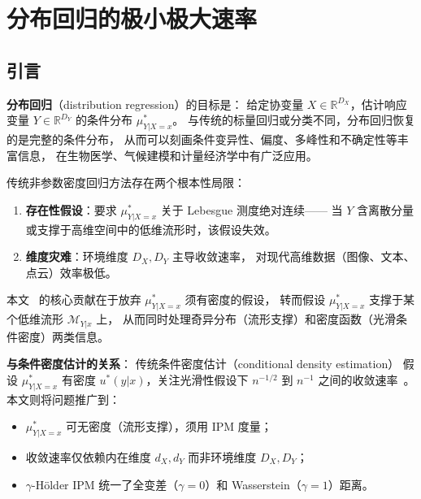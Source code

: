 \chapter{分布回归的极小极大速率}\label{ch:chapter2}

\section{引言}\label{sec:ch2-intro}

\textbf{分布回归}（distribution regression）的目标是：
给定协变量 $X \in \mathbb{R}^{D_X}$，估计响应变量 $Y \in \mathbb{R}^{D_Y}$
的条件分布 $\mu^*_{Y|X=x}$。
与传统的标量回归或分类不同，分布回归恢复的是完整的条件分布，
从而可以刻画条件变异性、偏度、多峰性和不确定性等丰富信息，
在生物医学、气候建模和计量经济学中有广泛应用。

传统非参数密度回归方法存在两个根本性局限：
\begin{enumerate}
    \item \textbf{存在性假设}：要求 $\mu^*_{Y|X=x}$ 关于 Lebesgue 测度绝对连续——
          当 $Y$ 含离散分量或支撑于高维空间中的低维流形时，该假设失效。
    \item \textbf{维度灾难}：环境维度 $D_X, D_Y$ 主导收敛速率，
          对现代高维数据（图像、文本、点云）效率极低。
\end{enumerate}

本文~\citep{tang2025regression} 的核心贡献在于放弃 $\mu^*_{Y|X=x}$ 须有密度的假设，
转而假设 $\mu^*_{Y|X=x}$ 支撑于某个低维流形 $\mathcal{M}_{Y|x}$ 上，
从而同时处理奇异分布（流形支撑）和密度函数（光滑条件密度）两类信息。

\textbf{与条件密度估计的关系}：
传统条件密度估计（conditional density estimation）
假设 $\mu^*_{Y|X=x}$ 有密度 $u^*(y|x)$，关注光滑性假设下
$n^{-1/2}$ 到 $n^{-1}$ 之间的收敛速率~\citep{Hyndman1995,Li2022}。
本文则将问题推广到：
\begin{itemize}
    \item $\mu^*_{Y|X=x}$ 可无密度（流形支撑），须用 IPM 度量；
    \item 收敛速率仅依赖内在维度 $d_X, d_Y$ 而非环境维度 $D_X, D_Y$；
    \item $\gamma$-Hölder IPM 统一了全变差（$\gamma=0$）和 Wasserstein（$\gamma=1$）距离。
\end{itemize}

